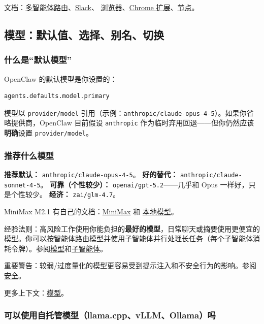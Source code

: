文档：\href{/concepts/multi-agent}{多智能体路由}、\href{/channels/slack}{Slack}、
\href{/tools/browser}{浏览器}、\href{/tools/chrome-extension}{Chrome 扩展}、\href{/nodes}{节点}。

\subsection{模型：默认值、选择、别名、切换}


\subsubsection{什么是“默认模型”}


OpenClaw 的默认模型是你设置的：

\begin{lstlisting}
agents.defaults.model.primary
\end{lstlisting}


模型以 \texttt{provider/model} 引用（示例：\texttt{anthropic/claude-opus-4-5}）。如果你省略提供商，OpenClaw 目前假设 \texttt{anthropic} 作为临时弃用回退——但你仍然应该\textbf{明确}设置 \texttt{provider/model}。

\subsubsection{推荐什么模型}


\textbf{推荐默认：} \texttt{anthropic/claude-opus-4-5}。
\textbf{好的替代：} \texttt{anthropic/claude-sonnet-4-5}。
\textbf{可靠（个性较少）：} \texttt{openai/gpt-5.2}——几乎和 Opus 一样好，只是个性较少。
\textbf{经济：} \texttt{zai/glm-4.7}。

MiniMax M2.1 有自己的文档：\href{/providers/minimax}{MiniMax} 和
\href{/gateway/local-models}{本地模型}。

经验法则：高风险工作使用你能负担的\textbf{最好的模型}，日常聊天或摘要使用更便宜的模型。你可以按智能体路由模型并使用子智能体并行处理长任务（每个子智能体消耗令牌）。参阅\href{/concepts/models}{模型}和\href{/tools/subagents}{子智能体}。

重要警告：较弱/过度量化的模型更容易受到提示注入和不安全行为的影响。参阅\href{/gateway/security}{安全}。

更多上下文：\href{/concepts/models}{模型}。

\subsubsection{可以使用自托管模型（llama.cpp、vLLM、Ollama）吗}


